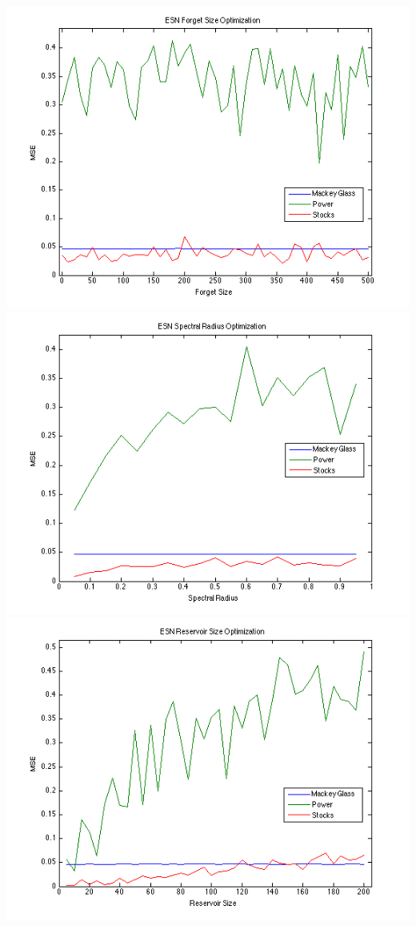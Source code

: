 \documentclass{acm_proc_article-sp}
\begin{document}
\begin{center}
\includegraphics[scale=0.45]{ForgetSizeOptimization.png}
\includegraphics[scale=0.45]{SpectralRadiusOptimization.png}
\includegraphics[scale=0.45]{ReservoirSizeOptimization.png}

\end{center}
\end{document}
